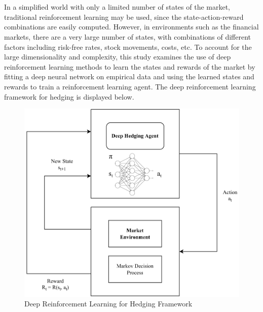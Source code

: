 \\ \\
In a simplified world with only a limited number of states of the market, traditional reinforcement learning may be used, since the state-action-reward combinations are easily computed. However, in environments such as the financial markets, there are a very large number of states, with combinations of different factors including risk-free rates, stock movements, costs, etc. To account for the large dimensionality and complexity, this study examines the use of deep reinforcement learning methods to learn the states and rewards of the market by fitting a deep neural network on empirical data and using the learned states and rewards to train a reinforcement learning agent. The deep reinforcement learning framework for hedging is displayed below.
\begin{figure}[h]
\centering
\includegraphics[width=11.5cm]{templates/assets/drl/drl.png}
\caption{Deep Reinforcement Learning for Hedging Framework}
\end{figure}


